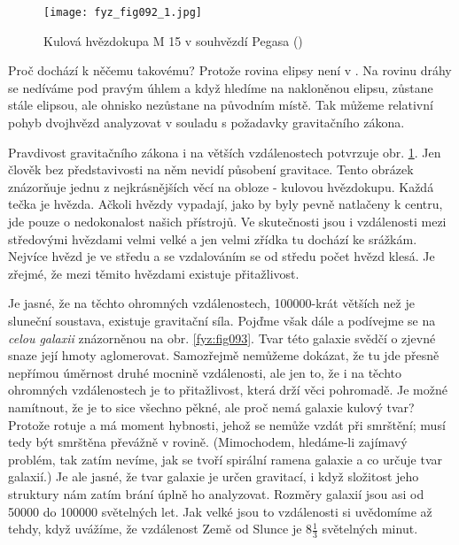     \begin{figure}[ht!]  %
      \centering
      \texttt{[image: fyz\_fig092\_1.jpg]}
      \caption{Kulová hvězdokupa M 15 v souhvězdí Pegasa (\cite[s.~100]{Feynman01})}
      \label{fyz:fig092}
    \end{figure}
    
    Proč dochází k něčemu takovému? Protože rovina elipsy není v . Na rovinu 
    dráhy se nedíváme pod pravým úhlem a když hledíme na nakloněnou elipsu, zůstane stále elipsou, 
    ale ohnisko nezůstane na původním místě. Tak můžeme relativní pohyb dvojhvězd analyzovat v 
    souladu s požadavky gravitačního zákona. 
    
    Pravdivost gravitačního zákona i na větších vzdálenostech potvrzuje obr. \ref{fyz:fig092}. Jen 
    člověk bez představivosti na něm nevidí působení gravitace. Tento obrázek znázorňuje jednu z 
    nejkrásnějších věcí na obloze - kulovou hvězdokupu. Každá tečka je hvězda. Ačkoli hvězdy 
    vypadají, jako by byly pevně natlačeny k centru, jde pouze o nedokonalost našich přístrojů. Ve 
    skutečnosti jsou i vzdálenosti mezi středovými hvězdami velmi velké a jen velmi zřídka tu 
    dochází ke srážkám. Nejvíce hvězd je ve středu a se vzdalováním se od středu počet hvězd klesá. 
    Je zřejmé, že mezi těmito hvězdami existuje přitažlivost. 
    
    Je jasné, že na těchto ohromných vzdálenostech, \num{100000}-krát větších než je sluneční 
    soustava, existuje gravitační síla. Pojďme však dále a podívejme se na \emph{celou galaxii} 
    znázorněnou na obr. \ref{fyz:fig093}. Tvar této galaxie svědčí o zjevné snaze její hmoty 
    aglomerovat. Samozřejmě nemůžeme dokázat, že tu jde přesně nepřímou úměrnost druhé mocnině 
    vzdálenosti, ale jen to, že i na těchto ohromných vzdálenostech je to přitažlivost, která drží 
    věci pohromadě. Je možné namítnout, že je to sice všechno pěkné, ale proč nemá galaxie kulový 
    tvar? Protože rotuje a má moment hybnosti, jehož se nemůže vzdát při smrštění; musí tedy být 
    smrštěna převážně v rovině. (Mimochodem, hledáme-li zajímavý problém, tak zatím nevíme, jak se 
    tvoří spirální ramena galaxie a co určuje tvar galaxií.) Je ale jasné, že tvar galaxie je určen 
    gravitací, i když složitost jeho struktury nám zatím brání úplně ho analyzovat. Rozměry galaxií 
    jsou asi od \num{50000} do \num{100000} světelných let. Jak velké jsou to vzdálenosti si 
    uvědomíme až tehdy, když uvážíme, že vzdálenost Země od Slunce je  \(8\tfrac{1}{3}\) světelných 
    minut. 
    
